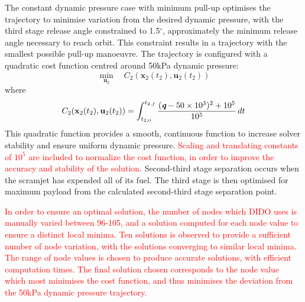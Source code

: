 \documentclass[journal]{new-aiaa}
\begin{document}
	 	 
	 	 The constant dynamic pressure case with minimum pull-up optimises the trajectory to minimise variation from the desired dynamic pressure, with the third stage release angle constrained to 1.5$^\circ$, approximately the minimum release angle necessary to reach orbit. This constraint results in a trajectory with the smallest possible pull-up manoeuvre. 
	 	 The trajectory is configured with a quadratic cost function centred around 50kPa dynamic pressure:
	 	 \begin{equation} 
	 	 \min\limits_{\textbf{u}_2} \quad C_2(\textbf{x}_{2}(t_2),\textbf{u}_{2}(t_2))
	 	 \end{equation}
	 	 where
	 	 \begin{equation}
	 	 C_2(\textbf{x}_{2}(t_2),\textbf{u}_{2}(t_2)) = \int_{t_{2,0}}^{t_{2,f}} \frac{(\textit{\textbf{q}}-50\times 10^3)^2+10^5}{10^5} \, dt
	 	 \end{equation}
	This quadratic function provides a smooth, continuous function to increase solver stability and ensure uniform dynamic pressure. \textcolor{red}{Scaling and translating constants of $10^5$ are included to normalize the cost function, in order to improve the accuracy and stability of the solution}. Second-third stage separation occurs when the scramjet has expended all of its fuel.  The third stage is then optimised for maximum payload from the calculated second-third stage separation point. 
	
	\textcolor{red}{In order to ensure an optimal solution, the number of nodes which DIDO uses is manually varied between 96-105, and a solution computed for each node value to ensure a distinct local minima. Ten solutions is observed to provide a sufficient number of node variation, with the solutions converging to similar local minima. The range of node values is chosen to produce accurate solutions, with efficient computation times. The final solution chosen corresponds to the node value which most minimises the cost function, and thus minimises the deviation from the 50kPa dynamic pressure trajectory. }
	 	 
\end{document}
